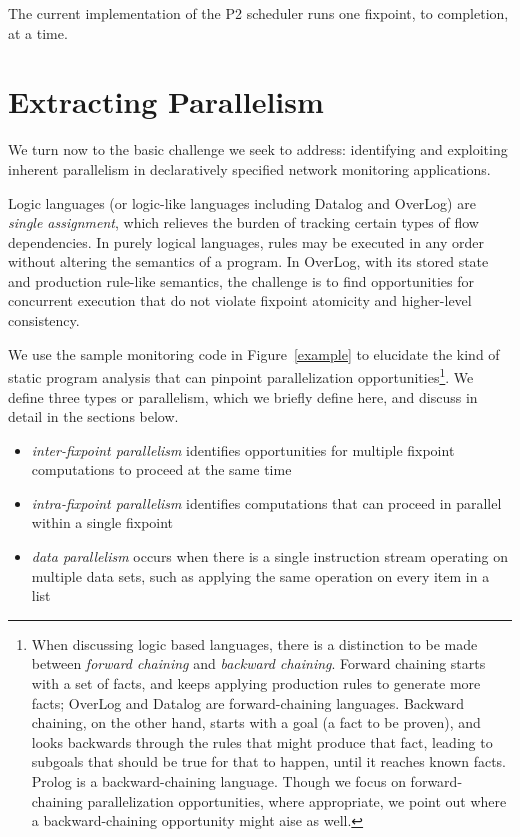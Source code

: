 \documentclass[10pt,twocolumn]{MyTightStyle}
\begin{document}
The current implementation of the P2 scheduler runs one fixpoint, to
completion, at a time.


\section{Extracting Parallelism}


We turn now to the basic challenge we seek to address: identifying and
exploiting inherent parallelism in declaratively specified network
monitoring applications.

Logic languages (or logic-like languages including Datalog and OverLog)
are {\em single assignment}, which relieves the burden of tracking
certain types of flow dependencies. In purely logical languages, rules
may be executed in any order without altering the semantics of a
program. In OverLog, with its stored state and production rule-like
semantics, the challenge is to find opportunities for concurrent
execution that do not violate fixpoint atomicity and higher-level consistency.


We use the sample monitoring code in Figure~\ref{example} to elucidate
the kind of static program analysis that can pinpoint parallelization
opportunities\footnote{When discussing logic based languages, there is a
distinction to be made between \emph{forward chaining} and
\emph{backward chaining}. Forward chaining starts with a set of facts,
and keeps applying production rules to generate more facts; OverLog and
Datalog are forward-chaining languages.  Backward chaining, on the other
hand, starts with a goal (a fact to be proven), and looks backwards
through the rules that might produce that fact, leading to subgoals that
should be true for that to happen, until it reaches known facts.  Prolog
is a backward-chaining language.  Though we focus on forward-chaining
parallelization opportunities, where appropriate, we point out where a
backward-chaining opportunity might aise as well.}. We define three
types or parallelism, which we briefly define here, and discuss in
detail in the sections below.

\begin{itemize}
\item {\em inter-fixpoint parallelism} identifies opportunities 
for multiple fixpoint computations to proceed at the same time
\item {\em intra-fixpoint parallelism} identifies computations 
that can proceed in parallel within a single fixpoint
\item {\em data parallelism} occurs when there is a single 
instruction stream operating on multiple data sets, such as 
applying the same operation on every item in a list
\end{itemize}
\end{document}
